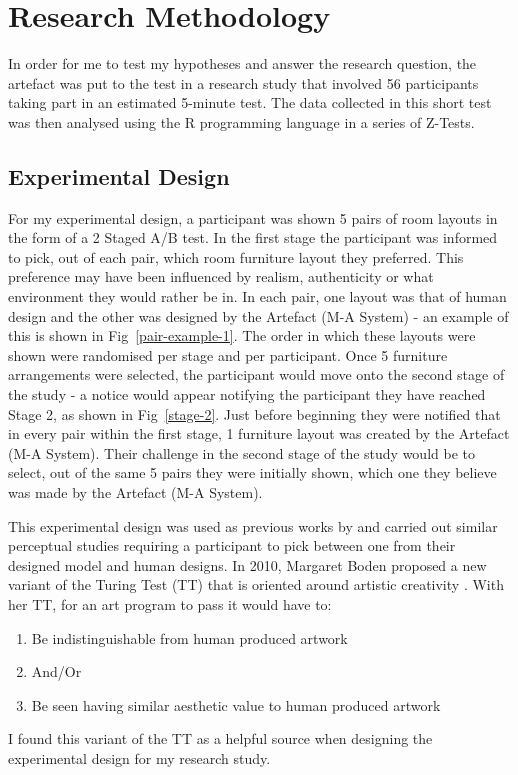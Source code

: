 \section{Research Methodology}
In order for me to test my hypotheses and answer the research question, the artefact was put to the test in a research study that involved 56 participants taking part in an estimated 5-minute test. The data collected in this short test was then analysed using the R programming language in a series of Z-Tests.

\subsection{Experimental Design}
For my experimental design, a participant was shown 5 pairs of room layouts in the form of a 2 Staged A/B test.
In the first stage the participant was informed to pick, out of each pair, which room furniture layout they preferred. This preference may have been influenced by realism, authenticity or what environment they would rather be in. In each pair, one layout was that of human design and the other was designed by the Artefact (M-A System) - an example of this is shown in Fig~\ref{pair-example-1}. The order in which these layouts were shown were randomised per stage and per participant.
Once 5 furniture arrangements were selected, the participant would move onto the second stage of the study - a notice would appear notifying the participant they have reached Stage 2, as shown in Fig~\ref{stage-2}. Just before beginning they were notified that in every pair within the first stage, 1 furniture layout was created by the Artefact (M-A System). Their challenge in the second stage of the study would be to select, out of the same 5 pairs they were initially shown, which one they believe was made by the Artefact (M-A System).

This experimental design was used as previous works by  \cite{constrained-layouts} and  \cite{make-it-home} carried out similar perceptual studies requiring a participant to pick between one from their designed model and human designs. In 2010, Margaret Boden proposed a new variant of the Turing Test (TT) that is oriented around artistic creativity \cite{artistic-tt}. With her TT, for an art program to pass it would have to:
\begin{enumerate}
    \item Be indistinguishable from human produced artwork
    \item[]And/Or
    \item Be seen having similar aesthetic value to human produced artwork
\end{enumerate}
I found this variant of the TT as a helpful source when designing the experimental design for my research study.


